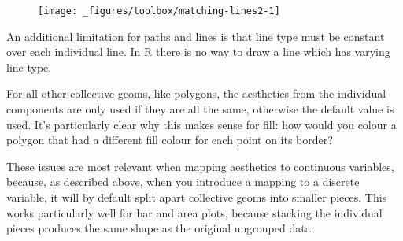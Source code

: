\begin{Shaded}
\begin{Highlighting}[]
\StringTok{ }\NormalTok{(} \NormalTok{))}
\StringTok{ }\NormalTok{(}
   \OperatorTok{$}\OperatorTok{$}\OperatorTok{$}
   \OperatorTok{$}\OperatorTok{$}\OperatorTok{$}
\NormalTok{)}
\OperatorTok{+}\StringTok{ }
\StringTok{  }\NormalTok{(} \NormalTok{) }\OperatorTok{+}
\StringTok{  }\NormalTok{(} \NormalTok{)}
\end{Highlighting}
\end{Shaded}

\begin{figure}[H]
  \centering
  \texttt{[image: \_figures/toolbox/matching-lines2-1]}
\end{figure}

An additional limitation for paths and lines is that line type must be
constant over each individual line. In R there is no way to draw a line
which has varying line type.  

For all other collective geoms, like polygons, the aesthetics from the
individual components are only used if they are all the same, otherwise
the default value is used. It's particularly clear why this makes sense
for fill: how would you colour a polygon that had a different fill
colour for each point on its border? 

These issues are most relevant when mapping aesthetics to continuous
variables, because, as described above, when you introduce a mapping to
a discrete variable, it will by default split apart collective geoms
into smaller pieces. This works particularly well for bar and area
plots, because stacking the individual pieces produces the same shape as
the original ungrouped data:

